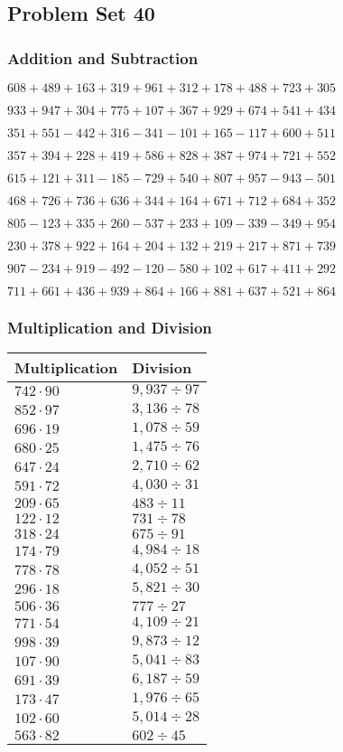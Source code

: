 \hypertarget{problem-set-40-2}{%
\subsection{Problem Set 40}\label{problem-set-40-2}}

\hypertarget{addition-and-subtraction-140}{%
\subsubsection{Addition and
Subtraction}\label{addition-and-subtraction-140}}

\(608 + 489 + 163 + 319 + 961 + 312 + 178 + 488 + 723 + 305\)

\(933 + 947 + 304 + 775 + 107 + 367 + 929 + 674 + 541 + 434\)

\(351 + 551 - 442 + 316 - 341 - 101 + 165 - 117 + 600 + 511\)

\(357 + 394 + 228 + 419 + 586 + 828 + 387 + 974 + 721 + 552\)

\(615 + 121 + 311 - 185 - 729 + 540 + 807 + 957 - 943 - 501\)

\(468 + 726 + 736 + 636 + 344 + 164 + 671 + 712 + 684 + 352\)

\(805 - 123 + 335 + 260 - 537 + 233 + 109 - 339 - 349 + 954\)

\(230 + 378 + 922 + 164 + 204 + 132 + 219 + 217 + 871 + 739\)

\(907 - 234 + 919 - 492 - 120 - 580 + 102 + 617 + 411 + 292\)

\(711 + 661 + 436 + 939 + 864 + 166 + 881 + 637 + 521 + 864\)

\hypertarget{multiplication-and-division-140}{%
\subsubsection{Multiplication and
Division}\label{multiplication-and-division-140}}

\begin{longtable}[]{@{}ll@{}}
\toprule
Multiplication & Division\tabularnewline
\midrule
\endhead
\(742 \cdot 90\) & \(9,937÷97\)\tabularnewline
\(852 \cdot 97\) & \(3,136 ÷78\)\tabularnewline
\(696 \cdot 19\) & \(1,078÷59\)\tabularnewline
\(680 \cdot 25\) & \(1,475÷76\)\tabularnewline
\(647 \cdot 24\) & \(2,710÷62\)\tabularnewline
\(591 \cdot 72\) & \(4,030÷31\)\tabularnewline
\(209 \cdot 65\) & \(483÷11\)\tabularnewline
\(122 \cdot 12\) & \(731÷78\)\tabularnewline
\(318 \cdot 24\) & \(675÷91\)\tabularnewline
\(174 \cdot 79\) & \(4,984÷18\)\tabularnewline
\(778 \cdot 78\) & \(4,052÷51\)\tabularnewline
\(296 \cdot 18\) & \(5,821÷30\)\tabularnewline
\(506 \cdot 36\) & \(777÷27\)\tabularnewline
\(771 \cdot 54\) & \(4,109÷21\)\tabularnewline
\(998 \cdot 39\) & \(9,873÷12\)\tabularnewline
\(107 \cdot 90\) & \(5,041÷83\)\tabularnewline
\(691 \cdot 39\) & \(6,187÷59\)\tabularnewline
\(173 \cdot 47\) & \(1,976÷65\)\tabularnewline
\(102 \cdot 60\) & \(5,014÷28\)\tabularnewline
\(563 \cdot 82\) & \(602÷45\)\tabularnewline
\bottomrule
\end{longtable}

